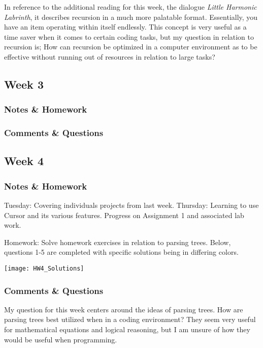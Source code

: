 \documentclass{article}
\theoremstyle{theorem}
\theoremstyle{definition}
\theoremstyle{remark}
\begin{document}
In reference to the additional reading for this week, the dialogue \textit{Little Harmonic Labrinth}, it describes recursion in a much more palatable format. Essentially, you have an item operating within itself endlessly. This concept is very useful as a time saver when it comes to certain coding tasks, but my question in relation to recursion is; How can recursion be optimized in a computer environment as to be effective without running out of resources in relation to large tasks? 

\subsection{Week 3}

\subsubsection*{Notes \& Homework}

\subsubsection*{Comments \& Questions}


\subsection{Week 4}

\subsubsection*{Notes \& Homework}
Tuesday: Covering individuals projects from last week. Thursday: Learning to use Cursor and its various features. Progress on Assignment 1 and associated lab work.

Homework: Solve homework exercises in relation to parsing trees. Below, questions 1-5 are completed with specific solutions being in differing colors.


\graphicspath{ {C:/Users/jrmul/OneDrive/Documents/CPSC_Courses/CPSC_354/images/} }
\begin{center} \texttt{[image: HW4\_Solutions]} \end{center}

\subsubsection*{Comments \& Questions}

My question for this week centers around the ideas of parsing trees. How are parsing trees best utilized when in a coding environment? They seem very useful for mathematical equations and logical reasoning, but I am unsure of how they would be useful when programming.
\end{document}
